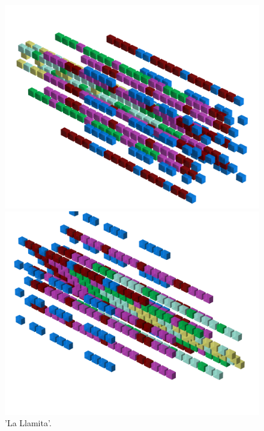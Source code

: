 \begin{figure}[H]
    \centering
    \begin{adjustbox}{width=12cm,center}
      \includegraphics[width=12cm]{src/patterns/pattern5-45.png}%
    \end{adjustbox}
    \begin{adjustbox}{width=12cm,margin=0cm -4cm}
      \includegraphics[width=12cm]{src/patterns/pattern5-225.png}%
    \end{adjustbox}
\caption{'La Llamita'.}
\end{figure}
\clearpage

